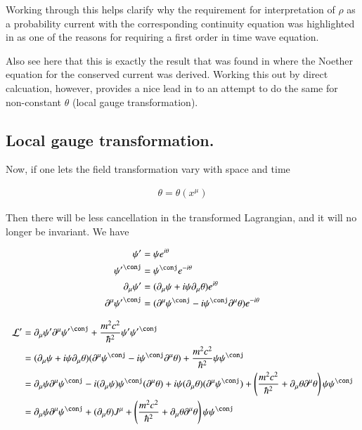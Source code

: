 \documentclass{article}
\begin{document}
Working through this helps clarify why the requirement for interpretation of $\rho$ as a probability current with the
corresponding continuity equation was highlighted in \cite{bohm1989qt} as one of the reasons for requiring a first order in time wave equation.

Also see here that this is exactly the result that was found in \cite{PJNoethersField} where the Noether equation for the conserved current
was derived.  Working this out by direct calcuation, however, provides a nice lead in to an attempt to do the same for non-constant $\theta$
(local gauge transformation).

\subsection{ Local gauge transformation. }

Now, if one lets the field transformation vary with space and time

\begin{align}
\theta = \theta(x^\mu)
\end{align}

Then there will be less cancellation in the transformed Lagrangian, and it will no longer be invariant.  We have

\begin{align*}
\psi' &= \psi e^{i\theta} \\
{\psi'}^\conj &= \psi^\conj e^{-i\theta} \\
\partial_\mu \psi' &= (\partial_\mu \psi + i \psi \partial_\mu \theta ) e^{i\theta}  \\
\partial^\mu {\psi'}^\conj &= (\partial^\mu \psi^\conj - i \psi^\conj \partial^\mu \theta) e^{-i\theta} \\
\end{align*}

\begin{align*}
\LL'
&= \partial_\mu \psi' \partial^\mu {\psi'}^\conj + \frac{m^2 c^2}{\hbar^2} \psi' {\psi'}^\conj \\
&=
(\partial_\mu \psi + i \psi \partial_\mu \theta ) (\partial^\mu \psi^\conj - i \psi^\conj \partial^\mu \theta)
+ \frac{m^2 c^2}{\hbar^2} \psi {\psi}^\conj \\
&=
\partial_\mu \psi \partial^\mu \psi^\conj
-i (\partial_\mu \psi) \psi^\conj (\partial^\mu \theta)
+ i \psi (\partial_\mu \theta) (\partial^\mu \psi^\conj)
+ \left( \frac{m^2 c^2}{\hbar^2} + \partial_\mu \theta \partial^\mu \theta \right) \psi {\psi}^\conj \\
&=
\partial_\mu \psi \partial^\mu \psi^\conj
+ (\partial_\mu \theta) J^\mu %
+ \left( \frac{m^2 c^2}{\hbar^2} + \partial_\mu \theta \partial^\mu \theta \right) \psi {\psi}^\conj \\
\end{align*}
\end{document}

